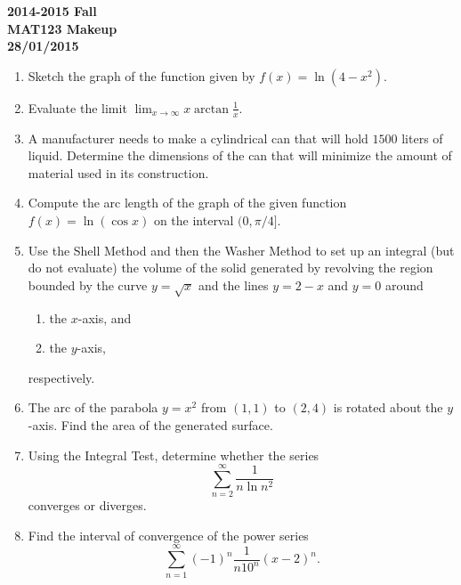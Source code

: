 \documentclass[a4paper, 12pt]{article}
\begin{document}
\newpage
{}
{}

\begin{center}
\textbf{2014-2015 Fall\\MAT123 Makeup\\28/01/2015}
\end{center}

\begin{enumerate}[leftmargin=*,label=\textbf{\arabic*.}]
\item Sketch the graph of the function given by $f(x)=\ln\left(4-x^2\right)$.

\item Evaluate the limit $\displaystyle\lim_{x\to\infty}x\arctan\frac1x$.

\item A manufacturer needs to make a cylindrical can that will hold $1500$ liters of liquid. Determine the dimensions of the can that will minimize the amount of material used in its construction.

\item Compute the arc length of the graph of the given function $f(x)=\ln(\cos x)$ on the interval $(0,\pi/4]$.

\item Use the Shell Method and then the Washer Method to set up an integral (but do not evaluate) the volume of the solid generated by revolving the region bounded by the curve $y=\sqrt x$ and the lines $y=2-x$ and $y=0$ around
\begin{enumerate}[leftmargin=*,label=\textbf{\alph*.}]
\item the $x$-axis, and
\item the $y$-axis,
\end{enumerate}
respectively.

\item The arc of the parabola $y=x^2$ from $(1,1)$ to $(2,4)$ is rotated about the $y$-axis. Find the area of the generated surface.

\item Using the Integral Test, determine whether the series
\[\displaystyle\sum_{n=2}^{\infty}\frac1{n\ln n^2}\]
converges or diverges.

\item Find the interval of convergence of the power series
\[\displaystyle\sum_{n=1}^\infty(-1)^n\frac1{n10^n}(x-2)^n.\]

\end{enumerate}
\end{document}
